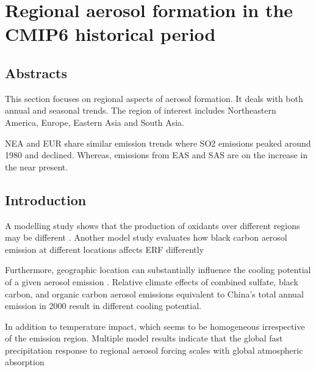 \chapter{Regional aerosol formation in the CMIP6 historical period}
\ifpdf
    \graphicspath{{Chapter5/Figs/Raster/}{Chapter3/Figs/PDF/}{Chapter5/Figs/}}
\else
    \graphicspath{{Chapter5/Figs/Vector/}{Chapter5/Figs/}}
\fi



\section*{Abstracts}
This section focuses on regional aspects of aerosol formation. It deals with both annual and seasonal trends. The region of interest includes Northeastern America, Europe, Eastern Asia and South Asia.

NEA and EUR share similar emission trends where SO2 emissions peaked around 1980 and declined. Whereas, emissions from EAS and SAS are on the increase in the near present. 

\section{Introduction}
A modelling study shows that the production of oxidants over different regions may be different \cite{zhangTroposphericOzoneChange2016}. Another model study evaluates how black carbon aerosol emission at different locations affects ERF differently \citep{williamsStrongControlEffective2022}

Furthermore, geographic location can substantially influence the cooling potential of a given aerosol emission \citep{persadDivergentGlobalscaleTemperature2018}. Relative climate effects of combined sulfate, black carbon, and organic carbon aerosol emissions equivalent to China's total annual emission in 2000 result in different cooling potential.

In addition to temperature impact, which seems to be homogeneous irrespective of the emission region. Multiple model results indicate that the global fast precipitation response to regional aerosol forcing scales with global atmospheric absorption \citep{myhrePDRMIPPrecipitationDriver2017}

